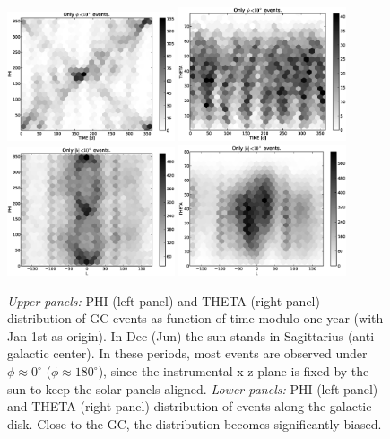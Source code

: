 \documentclass[aps,twocolumn,prd,superscriptaddress,showpacs,nofootinbib,fixfloat]{revtex4}
\begin{document}
\begin{figure}
  \centering
  \includegraphics[width=0.44\textwidth]{plots/TIME_PHI.eps}
  \includegraphics[width=0.44\textwidth]{plots/TIME_THETA.eps}
  \includegraphics[width=0.44\textwidth]{plots/L_PHI.eps}
  \includegraphics[width=0.44\textwidth]{plots/L_THETA.eps}
  \caption{\emph{Upper panels:} PHI (left panel) and THETA (right panel)
  distribution of GC events as function of time modulo one year (with Jan 1st
  as origin). In Dec (Jun) the sun stands in Sagittarius (anti galactic
  center). In these periods, most events are observed under $\phi\approx
  0^\circ$ ($\phi\approx 180^\circ$), since the instrumental x-z plane is
  fixed by the sun to keep the solar panels aligned. \emph{Lower panels:} PHI
  (left panel) and THETA (right panel) distribution of events along the
  galactic disk. Close to the GC, the distribution becomes significantly
  biased.}
  \label{fig:time_phi}
\end{figure}
\end{document}

